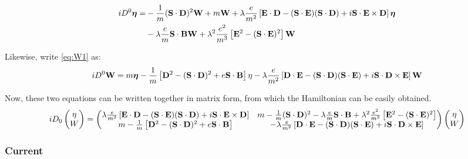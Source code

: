\begin{equation}
\begin{split}
iD^0 \mbox{\boldmath$ \eta $} =&	-\frac{1}{m} (\mathbf{S} \cdot \mathbf{D})^2 \mathbf{W} 
								+ m\mathbf{W} 
								+ \lambda \frac{e}{m^2} \left [ \mathbf{E} \cdot \mathbf{D} - (\mathbf{S} \cdot \mathbf{E})( \mathbf{S} \cdot \mathbf{D}) + i \mathbf{S} \cdot \mathbf{E} \times \mathbf{D} \right ] \mbox{\boldmath$ \eta $} 	\\
							&	- \lambda \frac{e}{m} \mathbf{S} \cdot \mathbf{B} \mathbf{W}
								+ \lambda^2 \frac{e^2}{m^3} \left [ \mathbf{E}^2 - (\mathbf{S} \cdot \mathbf{E})^2 \right ] \mathbf{W}
\end{split}
\end{equation}

Likewise, write \eqref{eq:W1} as:
\begin{equation}
iD^0 \mathbf{W} =	m\mbox{\boldmath$ \eta $}
		- \frac{1}{m}\left [ \mathbf{D}^2 - (\mathbf{S} \cdot \mathbf{D})^2 + e \mathbf{S} \cdot \mathbf{B} \right ] \mathbf{\eta}
		- \lambda \frac{e}{m^2} \left [ \mathbf{D} \cdot \mathbf{E} - (\mathbf{S} \cdot \mathbf{D}) (\mathbf{S} \cdot \mathbf{E}) + i \mathbf{S} \cdot \mathbf{D} \times \mathbf{E} \right ] \mathbf{W}
\end{equation}

Now, these two equations can be written together in matrix form, from which the Hamiltonian can be easily obtained.
\begin{equation*}
iD_0
\begin{pmatrix}
\eta	\\	W
\end{pmatrix} 
=
\begin{pmatrix}
	\lambda \frac{e}{m^2} \left [ \mathbf{E} \cdot \mathbf{D} - (\mathbf{S} \cdot \mathbf{E})( \mathbf{S} \cdot \mathbf{D}) + i \mathbf{S} \cdot \mathbf{E} \times \mathbf{D} \right ]
&
	m
	-\frac{1}{m} (\mathbf{S} \cdot \mathbf{D})^2 
	- \lambda \frac{e}{m} \mathbf{S} \cdot \mathbf{B}
	+ \lambda^2 \frac{e^2}{m^3} \left [ \mathbf{E}^2 - (\mathbf{S} \cdot \mathbf{E})^2 \right ] 
\\
	m
	- \frac{1}{m}\left [ \mathbf{D}^2 - (\mathbf{S} \cdot \mathbf{D})^2 + e \mathbf{S} \cdot \mathbf{B} \right ] 
&
	- \lambda \frac{e}{m^2} \left [ \mathbf{D} \cdot \mathbf{E} - (\mathbf{S} \cdot \mathbf{D}) (\mathbf{S} \cdot \mathbf{E}) + i \mathbf{S} \cdot \mathbf{D} \times \mathbf{E} \right ] 
\end{pmatrix}
\begin{pmatrix}
\eta	\\	W
\end{pmatrix}
\end{equation*}

\subsubsection*{Current}

